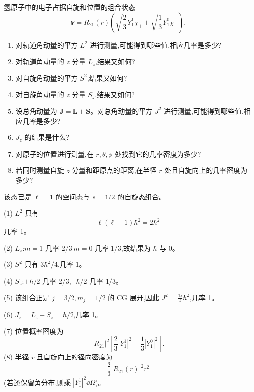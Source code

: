 \begin{question}
氢原子中的电子占据自旋和位置的组合状态
\[
\Psi=R_{21}(r)\left(\sqrt{\frac23}Y_1^1\chi_+ +\sqrt{\frac13}Y_1^0\chi_-\right).
\]
\begin{enumerate}
\item 对轨道角动量的平方 $L^2$ 进行测量,可能得到哪些值,相应几率是多少?
\item 对轨道角动量的 $z$ 分量 $L_z$,结果又如何?
\item 对自旋角动量的平方 $S^2$,结果又如何?
\item 对自旋角动量的 $z$ 分量 $S_z$,结果又如何?
\item 设总角动量为 $\mathbf J=\mathbf L+\mathbf S$。对总角动量的平方 $J^2$ 进行测量,可能得到哪些值,相应几率是多少?
\item $J_z$ 的结果是什么?
\item 对原子的位置进行测量,在 $r,\theta,\phi$ 处找到它的几率密度为多少?
\item 若同时测量自旋 $z$ 分量和距原点的距离,在半径 $r$ 处且自旋向上的几率密度为多少?
\end{enumerate}
\begin{solution}

该态已是 $\ell=1$ 的空间态与 $s=1/2$ 的自旋态组合。

(1) $L^2$ 只有
\[
\ell(\ell+1)
\hbar^2=2\hbar^2
\]
几率 1。

(2) $L_z$:$m=1$ 几率 $2/3$,$m=0$ 几率 $1/3$,故结果为 $\hbar$ 与 $0$。

(3) $S^2$ 只有 $3\hbar^2/4$,几率 1。

(4) $S_z$:$+\hbar/2$ 几率 $2/3$,$-\hbar/2$ 几率 $1/3$。

(5) 该组合正是 $j=3/2,m_j=1/2$ 的 CG 展开,因此 $J^2=\frac{15}{4}\hbar^2$,几率 1。

(6) $J_z=L_z+S_z=\hbar/2$,几率 1。

(7) 位置概率密度为
\[
|R_{21}|^2\left[\frac23|Y_1^1|^2+\frac13|Y_1^0|^2\right].
\]
(8) 半径 $r$ 且自旋向上的径向密度为
\[
\frac23 |R_{21}(r)|^2r^2
\]
(若还保留角分布,则乘 $|Y_1^1|^2\dd\Omega$)。

\end{solution}
\end{question}

